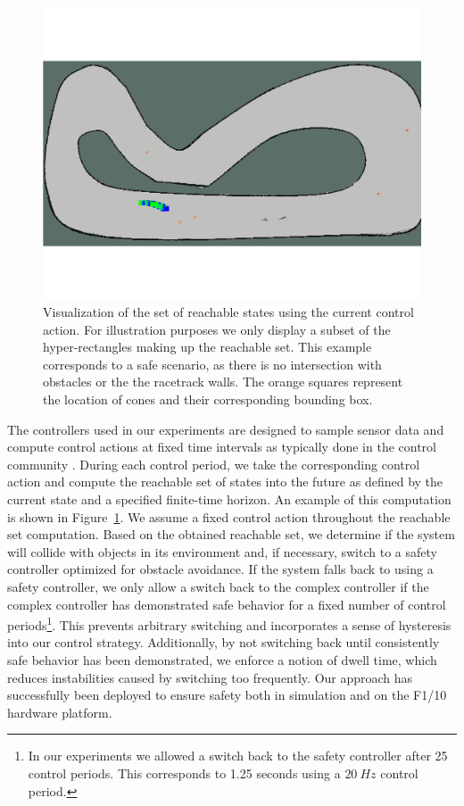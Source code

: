 \documentclass[manuscript,screen,review]{acmart}
\begin{document}
 
\begin{figure}[htpb]%
  \centering
    \includegraphics[width=0.95\linewidth]{figures/viz_option_two.pdf}
   \caption{Visualization of the set of reachable states using the current control action. For illustration purposes we only display a subset of the hyper-rectangles making up the reachable set. This example corresponds to a safe scenario, as there is no intersection with obstacles or the the racetrack walls. The orange squares represent the location of cones and their corresponding bounding box.}
  \label{fig:reachset}
\end{figure}

The controllers used in our experiments are designed to sample sensor data and compute control actions at fixed time intervals as typically done in the control community \cite{Dai2020}. During each control period, we take the corresponding control action and compute the reachable set of states into the future as defined by the current state and a specified finite-time horizon. An example of this computation is shown in Figure~\ref{fig:reachset}. We assume a fixed control action throughout the reachable set computation. Based on the obtained reachable set, we determine if the system will collide with objects in its environment and, if necessary, switch to a safety controller optimized for obstacle avoidance. If the system falls back to using a safety controller, we only allow a switch back to the complex controller if the complex controller has demonstrated safe behavior for a fixed number of control periods\footnote{In our experiments we allowed a switch back to the safety controller after 25 control periods. This corresponds to 1.25 seconds using a $20\ Hz$ control period.}. This prevents arbitrary switching and incorporates a sense of hysteresis into our control strategy. Additionally, by not switching back until consistently safe behavior has been demonstrated, we enforce a notion of dwell time, which reduces instabilities caused by switching too frequently. Our approach has successfully been deployed to ensure safety both in simulation and on the F1/10 hardware platform.
\end{document}
